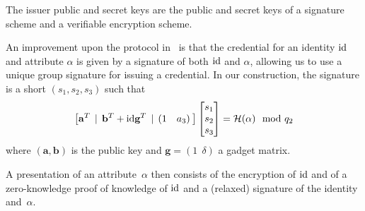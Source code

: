 The issuer public and secret keys are the public and secret keys of a 
signature scheme and a verifiable encryption scheme.

An improvement upon the protocol in~\cite{CCS:delLyuSei18} is that the 
credential for an identity $\text{id}$ and attribute $\alpha$ is given 
by a signature of both $\text{id}$ and $\alpha$, allowing us to use a 
unique group signature for issuing a credential. In our construction,
the signature is a short $(s_{1}, s_{2}, s_{3})$ such that 
\begin{equation}\label{eq:02_TechIntro_sign} \big[\mathbf{a}^T \:\:|\:\: 
\mathbf{b}^T + \text{id} \mathbf{g}^T \:\:|\:\: (1 \quad a_3)\:\big]
	\begin{bmatrix} s_{1} \\ s_{2} \\ s_{3} \end{bmatrix} =
\mathcal{H}(\alpha) \mod  {q_2}
\end{equation}
where $(\mathbf{a},\mathbf{b})$ is the public key and $\mathbf{g} = (1\:\: \delta)$ a gadget matrix.

A presentation of an attribute~$\alpha$ then consists of the encryption of 
$\text{id}$ and of a zero-knowledge
 proof of knowledge of $\text{id}$ and a (relaxed) signature of the 
identity and~$\alpha$.


 

